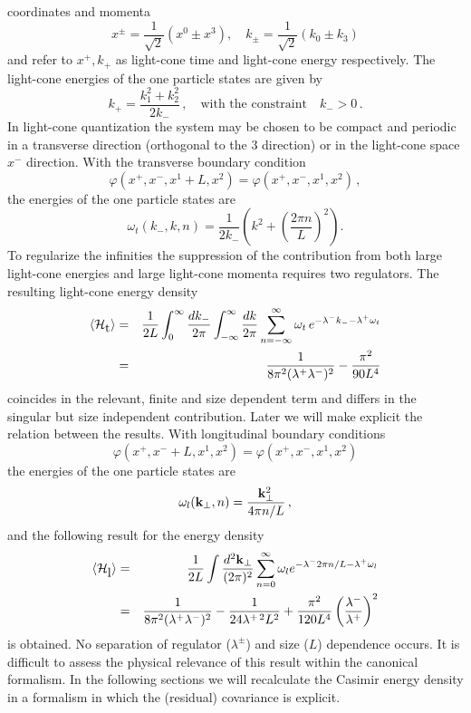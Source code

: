 \documentclass[a4paper,twocolumn,eqsecnum,aps]{revtex4}
\begin{document}
coordinates and momenta
$$x^{\pm}=\frac{1}{\sqrt{2}}(x^{0}\pm x^{3}),\quad k_{\pm}=\frac{1}{\sqrt{2}}(k_{0}\pm k_{3})$$
and refer to $x^{+},k_{+}$ as light-cone time and light-cone ener\-gy respectively. 
The light-cone energies of the one par\-ticle states are given by
$$k_{+} = \frac{k_{1}^2+k_{2}^2}{2 k_{-}}\, , \quad \mbox{with the constraint} \quad k_{-} > 0 \, .$$ 
In light-cone quantization  the system may be chosen to be compact and periodic  
in a transverse direction (orthogonal to the 3 direction) or in the light-cone space $x^{-}$ direction. 
With the transverse boundary condition
$$\varphi(x^+,x^-,x^1+L,x^2)= \varphi(x^+,x^-,x^1,x^2) \, ,$$
the energies of the one particle states are
$$\omega_{t}(k_-,k,n)=\frac{1}{2 k_{-}}\left(k^2+\left(\frac{2\pi n}{L}\right)^2\right).$$
To regularize the infinities the suppression of the contribution from both large light-cone energies and large  
light-cone momenta requires  two regulators. The resul\-ting 
light-cone energy density  
\begin{eqnarray}
\label{lct}
\langle{\cal H}_{\mbox{t}}\rangle&=&\frac{1}{2L}
\int_{0}^{\infty}\frac{ dk_-}{2\pi}\int_{-\infty}^{\infty}\frac{dk}{2\pi}\sum_{n=-\infty}^{\infty} \omega_{t}\,e^{-\lambda^{-}k_--\lambda^{+} \omega_{t}}
 \nonumber\\ &=&\frac{1}{8\pi^2 (\lambda^{+}\lambda^{-})^2} - \frac{\pi^2}{90 L^4}
\end{eqnarray}
coincides in the relevant, finite and size dependent term and differs in the singular but size 
independent contribution. Later we will make explicit the relation between the results. 
  \newline
With longitudinal boundary conditions
$$\varphi(x^+,x^-+L,x^1,x^2)= \varphi(x^+,x^-,x^1,x^2)$$
the energies of the one particle states are
$$\omega_{l}({\bf k}_{\perp},n)=\frac{{\bf k}_{\perp}^2}{4 \pi n/L} \,,$$
and the following result for the energy density 
\begin{eqnarray}
\label{lcl}
\langle{\cal H}_{\mbox{l}}\rangle&=&
\frac{1}{2L}\int\frac{d^{2}{\bf k}_\perp}{(2\pi)^2}\sum_{n=0}^{\infty}\omega_{l}
e^{-\lambda^{-}2\pi n/L-\lambda^{+}\omega_{l}} \nonumber \\
&=& \frac{1}{8\pi^2 (\lambda^{+}\lambda^{-})^2} - \frac{1}{24\lambda^{+\,2} L^2} + 
\frac{\pi^2}{120 L^4}\left(\frac{ \lambda^{-}}{\lambda^{+}}\right)^{2}\nonumber \\
\end{eqnarray}
is obtained. No separation of regulator ($\lambda^{\pm}$) and size  ($L$)  dependence occurs. 
 It is difficult to assess the physical relevance of this result within the canonical formalism.  In the following sections we will recalculate the 
Casimir energy density in 
a formalism in which the (residual) covariance is explicit. 
\end{document}

